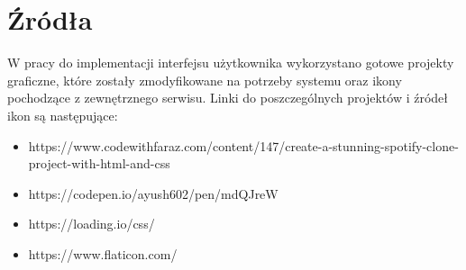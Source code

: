 \chapter{Źródła}

W pracy do implementacji interfejsu użytkownika wykorzystano gotowe projekty graficzne, które zostały zmodyfikowane na potrzeby systemu oraz ikony pochodzące z zewnętrznego serwisu. Linki do poszczególnych projektów i źródeł ikon są następujące:
\begin{itemize}
\item https://www.codewithfaraz.com/content/147/create-a-stunning-spotify-clone-project-with-html-and-css
\item https://codepen.io/ayush602/pen/mdQJreW
\item https://loading.io/css/
\item https://www.flaticon.com/
\end{itemize}
